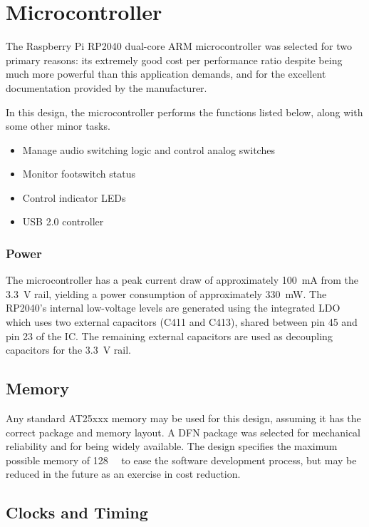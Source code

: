 \documentclass[12pt, titlepage]{tex-template}
\begin{document}
{{%

\section{Microcontroller}

The Raspberry Pi RP2040 dual-core ARM microcontroller was selected for two primary reasons: its extremely good cost per performance ratio despite being much more powerful than this application demands, and for the excellent documentation provided by the manufacturer.

In this design, the microcontroller performs the functions listed below, along with some other minor tasks.

\begin{itemize}
    \item Manage audio switching logic and control analog switches
    \item Monitor footswitch status
    \item Control indicator LEDs
    \item USB 2.0 controller
\end{itemize}

\subsubsection{Power}

The microcontroller has a peak current draw of approximately \SI{100}{\milli\ampere} from the \SI{3.3}{\volt} rail, yielding a power consumption of approximately \SI{330}{\milli\watt}. The RP2040's internal low-voltage levels are generated using the integrated LDO which uses two external capacitors (C411 and C413), shared between pin 45 and pin 23 of the IC. The remaining external capacitors are used as decoupling capacitors for the \SI{3.3}{\volt} rail.

\subsection{Memory}

Any standard AT25xxx memory may be used for this design, assuming it has the correct package and memory layout. A DFN package was selected for mechanical reliability and for being widely available. The design specifies the maximum possible memory of \SI{128}{\mega\bit} to ease the software development process, but may be reduced in the future as an exercise in cost reduction.

\subsection{Clocks and Timing}

}}
\end{document}
